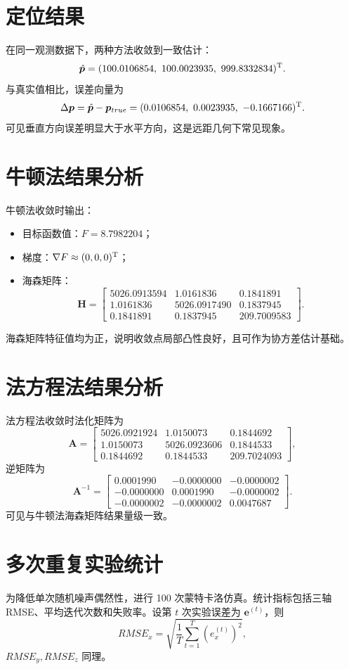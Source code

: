 \section{定位结果}
在同一观测数据下，两种方法收敛到一致估计：
\[
\hat{\bm p}=(100.0106854,\ 100.0023935,\ 999.8332834)^{\T}.
\]
与真实值相比，误差向量为
\[
\Delta\bm p=\hat{\bm p}-\bm p_{true}
=(0.0106854,\ 0.0023935,\ -0.1667166)^{\mathrm{T}}.
\]
可见垂直方向误差明显大于水平方向，这是远距几何下常见现象。

\section{牛顿法结果分析}
牛顿法收敛时输出：
\begin{itemize}
  \item 目标函数值：$F=8.7982204$；
  \item 梯度：$\nabla F\approx(0,0,0)^{\mathrm{T}}$；
  \item 海森矩阵：
\[
\bm H=
\begin{bmatrix}
5026.0913594 & 1.0161836 & 0.1841891\\
1.0161836 & 5026.0917490 & 0.1837945\\
0.1841891 & 0.1837945 & 209.7009583
\end{bmatrix}.
\]
\end{itemize}

海森矩阵特征值均为正，说明收敛点局部凸性良好，且可作为协方差估计基础。

\section{法方程法结果分析}
法方程法收敛时法化矩阵为
\[
\bm A=
\begin{bmatrix}
5026.0921924 & 1.0150073 & 0.1844692\\
1.0150073 & 5026.0923606 & 0.1844533\\
0.1844692 & 0.1844533 & 209.7024093
\end{bmatrix},
\]
逆矩阵为
\[
\bm A^{-1}=
\begin{bmatrix}
0.0001990 & -0.0000000 & -0.0000002\\
-0.0000000 & 0.0001990 & -0.0000002\\
-0.0000002 & -0.0000002 & 0.0047687
\end{bmatrix}.
\]
可见与牛顿法海森矩阵结果量级一致。

\section{多次重复实验统计}
为降低单次随机噪声偶然性，进行 100 次蒙特卡洛仿真。统计指标包括三轴 RMSE、平均迭代次数和失败率。设第 $t$ 次实验误差为 $\bm e^{(t)}$，则
\[
RMSE_x=\sqrt{\frac{1}{T}\sum_{t=1}^{T}(e_x^{(t)})^2},
\]
$RMSE_y,RMSE_z$ 同理。

